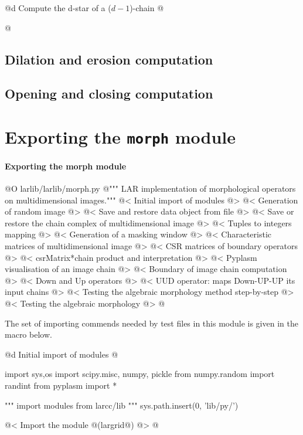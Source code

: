 \documentclass[11pt,oneside]{article}	%
\begin{document}
@d Compute the d-star of a ($d-1$)-chain
@{

@}


\subsection{Dilation and erosion computation}



\subsection{Opening and closing computation}




\section{Exporting the \texttt{morph} module}

\paragraph{Exporting the morph module}
@O larlib/larlib/morph.py
@{""" LAR implementation of morphological operators on multidimensional images."""
@< Initial import of modules @>
@< Generation of random image @>
@< Save and restore data object from file @>
@< Save or restore the chain complex of multidimensional image @>
@< Tuples to integers mapping @>
@< Generation of a masking window @>
@< Characteristic matrices of multidimensional image @>
@< CSR matrices of boundary operators @>
@< csrMatrix*chain product and interpretation @>
@< Pyplasm visualisation of an image chain @>
@< Boundary of image chain computation @>
@< Down and Up operators @>
@< UUD operator: maps Down-UP-UP its input chains @>
@< Testing the algebraic morphology method step-by-step @> 
@< Testing the algebraic morphology @> 
@}

The set of importing commends needed by test files in this module is given in the macro below.

@d Initial import of modules
@{import sys,os
import scipy.misc, numpy, pickle
from numpy.random import randint
from pyplasm import *

""" import modules from larcc/lib """
sys.path.insert(0, 'lib/py/')

@< Import the module @(largrid@) @>
@}
\end{document}
